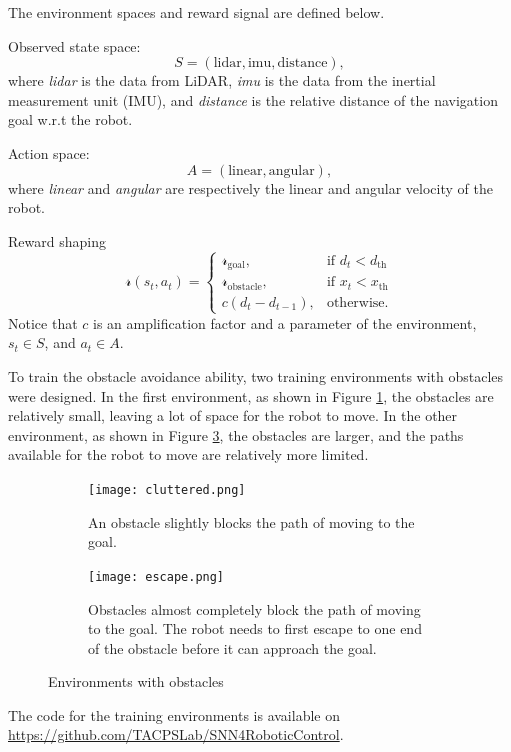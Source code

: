 {
\setlength{\parindent}{0pt}
\setlength{\parskip}{1.5ex}

The environment spaces and reward signal are defined below.

Observed state space:
\begin{equation*}
    S = (\text{lidar}, \text{imu}, \text{distance}),
\end{equation*}
where \textit{lidar} is the data from LiDAR, \textit{imu} is the data from 
 the inertial measurement unit (IMU), and \textit{distance} is the relative distance of the navigation goal w.r.t the robot.

Action space:
\begin{equation*}
    A = (\text{linear}, \text{angular}),
\end{equation*}
where \textit{linear} and \textit{angular} are respectively the linear and angular velocity of the robot.

Reward shaping
\begin{equation*}
    \mathcal{r}(s_t, a_t) = \begin{cases}
    \mathcal{r}_\text{goal}, &\text{if $d_t < d_\text{th}$}\\
    \mathcal{r}_\text{obstacle}, &\text{if $x_t < x_\text{th}$}\\
    c (d_t - d_{t-1}), &\text{otherwise.}
    \end{cases}
\end{equation*}
Notice that $c$ is an amplification factor and a parameter of the environment, $s_t \in S$, and $a_t \in A$.

}

To train the obstacle avoidance ability, two training environments with obstacles were designed. In the first environment, as shown in Figure \ref{fig:cluttered}, the obstacles are relatively small, leaving a lot of space for the robot to move. In the other environment, as shown in Figure \ref{fig:escape}, the obstacles are larger, and the paths available for the robot to move are relatively more limited.

\begin{figure}[htbp]
\centering
\begin{subfigure}[b]{0.49\textwidth}
   \centering
   \texttt{[image: cluttered.png]}
   \caption{An obstacle slightly blocks the path of moving to the goal.}
   \label{fig:cluttered}
\end{subfigure}
\begin{subfigure}[b]{0.49\textwidth}
   \centering
   \texttt{[image: escape.png]}
   \caption{Obstacles almost completely block the path of moving to the goal. The robot needs to first escape to one end of the obstacle before it can approach the goal.}
   \label{fig:escape}
\end{subfigure}
\caption{Environments with obstacles}
\end{figure}

The code for the training environments is available on \url{https://github.com/TACPSLab/SNN4RoboticControl}.
